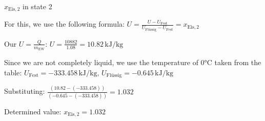 \( x_{\text{Eis},2} \) in state 2  

For this, we use the following formula:  
\( U = \frac{U - U_{\text{Fest}}}{U_{\text{Flüssig}} - U_{\text{Fest}}} = x_{\text{Eis},2} \)  

Our \( U = \frac{Q}{m_{\text{EW}}} \):  
\( U = \frac{10882}{1.08} = 10.82 \, \text{kJ/kg} \)  

Since we are not completely liquid, we use the temperature of 0°C taken from the table:  
\( U_{\text{Fest}} = -333.458 \, \text{kJ/kg}, \, U_{\text{Flüssig}} = -0.645 \, \text{kJ/kg} \)  

Substituting:  
\( \frac{(10.82 - (-333.458))}{(-0.645 - (-333.458))} = 1.032 \)  

Determined value:  
\( x_{\text{Eis},2} = 1.032 \)